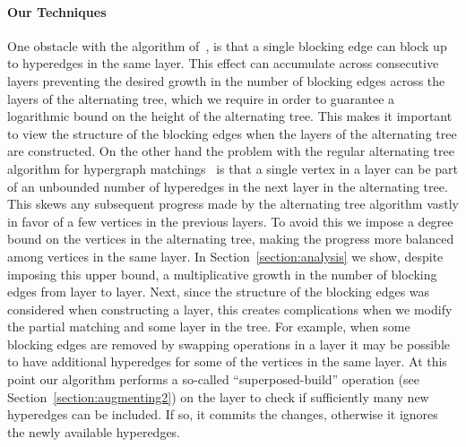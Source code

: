 \documentclass[11pt]{article}
\theoremstyle{definition}
\theoremstyle{remark}
\begin{document}
\paragraph{Our Techniques} One obstacle with the algorithm
of~\cite{DBLP:conf/soda/AnnamalaiKS15}, is that a single blocking edge
can block up to  hyperedges in the same layer. This effect can
accumulate across consecutive layers preventing the desired growth in
the number of blocking edges across the layers of the alternating
tree, which we require in order to guarantee a logarithmic bound on
the height of the alternating tree. This makes it important to view
the structure of the blocking edges when the layers of the alternating
tree are constructed. On the other hand the problem with the regular
alternating tree algorithm for hypergraph
matchings~\cite{haxell1995condition} is that a single  vertex in a
layer can be part of an unbounded number of hyperedges in the next
layer in the alternating tree. This skews any subsequent progress made
by the alternating tree algorithm vastly in favor of a few 
vertices in the previous layers. To avoid this we impose a degree
bound on the  vertices in the alternating tree, making the progress
more balanced among  vertices in the same layer. In
Section~\ref{section:analysis} we show, despite imposing this upper
bound, a multiplicative growth in the number of blocking edges from
layer to layer. Next, since the structure of the blocking edges was
considered when constructing a layer, this creates complications when
we modify the partial matching and some layer in the tree. For
example, when some blocking edges are removed by swapping operations
in a layer it may be possible to have additional hyperedges for some
of the  vertices in the same layer. At this point our algorithm
performs a so-called ``superposed-build'' operation (see
Section~\ref{section:augmenting2}) on the layer to check if
sufficiently many new hyperedges can be included. If so, it commits
the changes, otherwise it ignores the newly available hyperedges.
\end{document}
